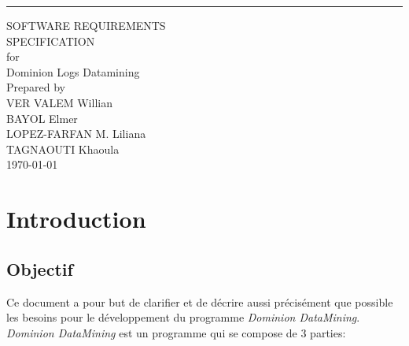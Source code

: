 \documentclass{scrreprt}
\date{}
\begin{document}
\begin{flushright}
    \rule{16cm}{5pt}\vskip1cm
    \begin{bfseries}
        \Huge{SOFTWARE REQUIREMENTS\\ SPECIFICATION}\\
        \vspace{1.9cm}
        for\\
        \vspace{1.9cm}
        Dominion Logs Datamining\\
        \vspace{1.9cm}
        Prepared by \\ VER VALEM Willian \\ BAYOL Elmer \\ LOPEZ-FARFAN M. Liliana
        \\ TAGNAOUTI Khaoula\\
        \vspace{1.9cm}
        \today\\
    \end{bfseries}
\end{flushright}

\tableofcontents




\chapter{Introduction}

\section{Objectif}

Ce document a pour but de clarifier et de décrire aussi précisément que possible les besoins pour le développement du programme \textit{Dominion DataMining}.\\
\textit{Dominion DataMining} est un programme qui se compose de 3 parties:
\end{document}
